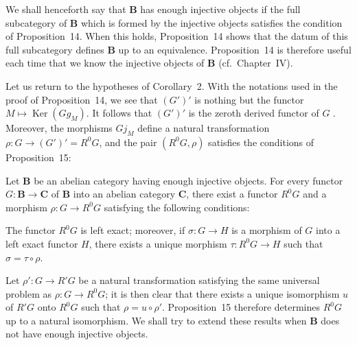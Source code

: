 We shall henceforth say that $\mathbf{B}$ has enough injective objects if the
full subcategory of $\mathbf{B}$ which is formed by the injective objects
satisfies the condition of Proposition~14. When this holds, Proposition~14
shows that the datum of this full subcategory defines $\mathbf{B}$ up to an
equivalence. Proposition~14 is therefore useful each time that we know the
injective objects of $\mathbf{B}$ (cf.\ Chapter~IV).

Let us return to the hypotheses of Corollary~2. With the notations used in the
proof of Proposition~14, we see that $(G')'$ is nothing but the functor
$M\mapsto\operatorname{Ker}(Gg_M)$. It follows that $(G')'$ is the zeroth
derived functor of $G$ \cite{cartan-eilenberg}. Moreover, the morphisms $Gj_M$ define a natural
transformation $\rho\colon G\to (G')' = R^{0}G$, and the pair
$(R^{0}G,\rho)$ satisfies the conditions of Proposition~15:

\begin{proposition}
Let $\mathbf{B}$ be an abelian category having enough injective objects. For
every functor $G\colon\mathbf{B}\to\mathbf{C}$ of $\mathbf{B}$ into an abelian
category $\mathbf{C}$, there exist a functor $R^{0}G$ and a morphism
$\rho\colon G\to R^{0}G$ satisfying the following conditions:

The functor $R^{0}G$ is left exact; moreover, if $\sigma\colon G\to H$ is a
morphism of $G$ into a left exact functor $H$, there exists a unique morphism
$\tau\colon R^{0}G\to H$ such that $\sigma = \tau\circ\rho$.
\end{proposition}

Let $\rho'\colon G\to R'G$ be a natural transformation satisfying the same
universal problem as $\rho\colon G\to R^{0}G$; it is then clear that there
exists a unique isomorphism $u$ of $R'G$ onto $R^{0}G$ such that
$\rho = u\circ\rho'$. Proposition~15 therefore determines $R^{0}G$ up to a
natural isomorphism. We shall try to extend these results when $\mathbf{B}$
does not have enough injective objects.